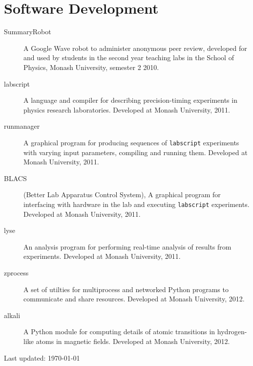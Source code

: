 \documentclass[10pt,a4paper]{article}
\begin{document}
\section*{Software Development}
\begin{description}
\item[SummaryRobot] A Google Wave robot to administer anonymous peer review, developed for and used by students in the second year teaching labs in the School of Physics, Monash University, semester 2 2010.

\item[labscript] A language and compiler for describing precision-timing experiments in physics research laboratories. Developed at Monash University, 2011.

\item[runmanager] A graphical program for producing sequences of \texttt{labscript} experiments with varying input parameters, compiling and running them. Developed at Monash University, 2011.

\item[BLACS] (Better Lab Apparatus Control System), A graphical program for interfacing with hardware in the lab and executing \texttt{labscript} experiments. Developed at Monash University, 2011.

\item[lyse] An analysis program for performing real-time analysis of results from experiments.  Developed at Monash University, 2011.

\item[zprocess] A set of utilties for multiprocess and networked Python programs to communicate and share resources. Developed at Monash University, 2012.

\item[alkali] A Python module for computing details of atomic transitions in hydrogen-like atoms in magnetic fields. Developed at Monash University, 2012.
\end{description}

\medskip

\begin{center}
  \begin{small}
    Last updated: \today
  \end{small}
\end{center}
\end{document}
